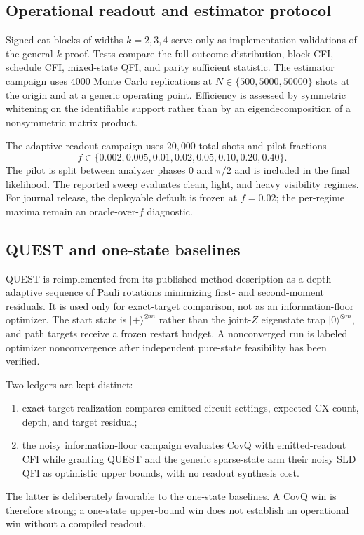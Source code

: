 \documentclass[11pt]{article}
\theoremstyle{definition}
\theoremstyle{remark}
\newcommand{\ket}[1]{\lvert #1\rangle}
\begin{document}
\subsection{Operational readout and estimator protocol}
Signed-cat blocks of widths $k=2,3,4$ serve only as implementation validations of the general-$k$ proof. Tests compare the full outcome distribution, block CFI, schedule CFI, mixed-state QFI, and parity sufficient statistic. The estimator campaign uses 4000 Monte Carlo replications at $N\in\{500,5000,50000\}$ shots at the origin and at a generic operating point. Efficiency is assessed by symmetric whitening on the identifiable support rather than by an eigendecomposition of a nonsymmetric matrix product.

The adaptive-readout campaign uses $20{,}000$ total shots and pilot fractions
\begin{equation}
  f\in\{0.002,0.005,0.01,0.02,0.05,0.10,0.20,0.40\}.
\end{equation}
The pilot is split between analyzer phases $0$ and $\pi/2$ and is included in the final likelihood. The reported sweep evaluates clean, light, and heavy visibility regimes. For journal release, the deployable default is frozen at $f=0.02$; the per-regime maxima remain an oracle-over-$f$ diagnostic.

\subsection{QUEST and one-state baselines}
QUEST is reimplemented from its published method description as a depth-adaptive sequence of Pauli rotations minimizing first- and second-moment residuals. It is used only for exact-target comparison, not as an information-floor optimizer. The start state is $\ket{+}^{\otimes m}$ rather than the joint-$Z$ eigenstate trap $\ket{0}^{\otimes m}$, and path targets receive a frozen restart budget. A nonconverged run is labeled optimizer nonconvergence after independent pure-state feasibility has been verified.

Two ledgers are kept distinct:
\begin{enumerate}[label=(\alph*)]
  \item exact-target realization compares emitted circuit settings, expected CX count, depth, and target residual;
  \item the noisy information-floor campaign evaluates CovQ with emitted-readout CFI while granting QUEST and the generic sparse-state arm their noisy SLD QFI as optimistic upper bounds, with no readout synthesis cost.
\end{enumerate}
The latter is deliberately favorable to the one-state baselines. A CovQ win is therefore strong; a one-state upper-bound win does not establish an operational win without a compiled readout.
\end{document}
